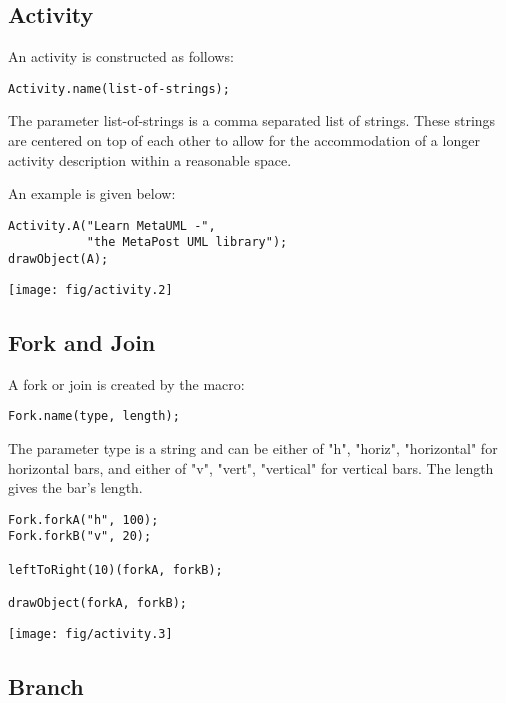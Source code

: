 \documentclass{article}
\newcommand{\code}{\ttfamily}
\begin{document}
\subsection{Activity}

An activity is constructed as follows:
\begin{verbatim}
Activity.name(list-of-strings);
\end{verbatim}

The parameter {\code list-of-strings} is a comma separated list of strings. These strings are
centered on top of each other to allow for the accommodation of a longer activity description
within a reasonable space.

An example is given below:

\begin{multicols}{2}
\begin{verbatim}
Activity.A("Learn MetaUML -",
           "the MetaPost UML library");
drawObject(A);
\end{verbatim}
\columnbreak
\hspace{1cm}\texttt{[image: fig/activity.2]}
\end{multicols}

\subsection{Fork and Join}

A fork or join is created by the macro:

\begin{verbatim}
Fork.name(type, length);
\end{verbatim}

The parameter {\code type} is a string and can be either of {\code "h"}, {\code "horiz"}, {\code "horizontal"} for horizontal bars, and either of {\code "v"}, {\code "vert"}, {\code "vertical"} for vertical bars. The {\code length} gives the bar's length.

\begin{multicols}{2}
\begin{verbatim}
Fork.forkA("h", 100);
Fork.forkB("v", 20);

leftToRight(10)(forkA, forkB);

drawObject(forkA, forkB);
\end{verbatim}
\columnbreak
\hspace{1cm}\texttt{[image: fig/activity.3]}
\end{multicols}

\subsection{Branch}
\end{document}
